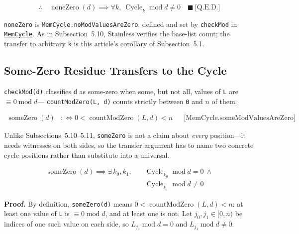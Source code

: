 \begin{equation*}
\therefore\quad
\operatorname{noneZero}(d)
  \implies \forall k,\ \operatorname{Cycle}_k\operatorname{mod}d\neq 0
  \quad \blacksquare\ \text{[Q.E.D.]}
\end{equation*}

\texttt{noneZero} is \texttt{MemCycle.noModValuesAreZero}, defined and set by
\texttt{checkMod} in
\href{https://github.com/thiagomata/prime-numbers/blob/cycle-article-v1.0.0/src/main/scala/v1/chapter4/cycle/memory/MemCycle.scala}{\texttt{MemCycle}}.
As in Subsection~5.10, Stainless verifies the base-list count; the transfer to
arbitrary \texttt{k} is this article's corollary of Subsection~5.1.

\subsection{Some-Zero Residue Transfers to the Cycle}

\texttt{checkMod(d)} classifies \texttt{d} as some-zero when some, but not all,
values of \texttt{L} are $\equiv 0\operatorname{mod}d$---
\texttt{countModZero(L, d)} counts strictly between \texttt{0} and $n$ of them:

\begin{equation*}
\begin{aligned}
\operatorname{someZero}(d)
  &:\Leftrightarrow 0<\operatorname{countModZero}(L,d)<n
  && \text{[MemCycle.someModValuesAreZero]}
\end{aligned}
\end{equation*}

Unlike Subsections~5.10--5.11, \texttt{someZero} is not a claim about
\emph{every} position---it needs witnesses on both sides, so the transfer
argument has to name two concrete cycle positions rather than substitute into
a universal.

\begin{equation*}
\begin{aligned}
\operatorname{someZero}(d)\implies \exists\,k_0,k_1,\quad
&\operatorname{Cycle}_{k_0}\operatorname{mod}d=0\ \land{} \\
&\operatorname{Cycle}_{k_1}\operatorname{mod}d\neq 0
\end{aligned}
\end{equation*}

\noindent\textbf{Proof.} By definition, \texttt{someZero(d)} means
$0<\operatorname{countModZero}(L,d)<n$: at least one value of \texttt{L} is
$\equiv 0\operatorname{mod}d$, and at least one is not. Let
$j_0,j_1\in[0,n)$ be indices of one such value on each side, so
$L_{j_0}\operatorname{mod}d=0$ and
$L_{j_1}\operatorname{mod}d\neq 0$.

